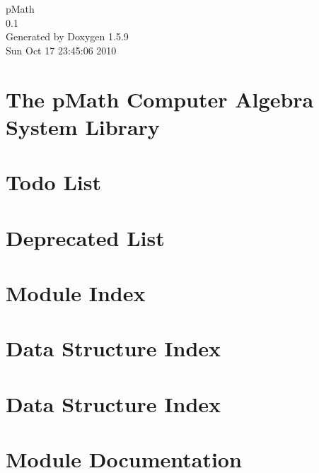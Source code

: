 \documentclass[a4paper]{article}
\begin{document}
\hypersetup{pageanchor=false}
\begin{titlepage}
\vspace*{7cm}
\begin{center}
{\Large pMath \\[1ex]\large 0.1 }\\
\vspace*{1cm}
{\large Generated by Doxygen 1.5.9}\\
\vspace*{0.5cm}
{\small Sun Oct 17 23:45:06 2010}\\
\end{center}
\end{titlepage}
\tableofcontents
{}
\hypersetup{pageanchor=true}
\section{The pMath Computer Algebra System Library}
\label{index}\hypertarget{index}{}
\section{Todo List}
\label{todo}
\hypertarget{todo}{}

\section{Deprecated List}
\label{deprecated}
\hypertarget{deprecated}{}

\section{Module Index}

\section{Data Structure Index}

\section{Data Structure Index}

\section{Module Documentation}




















\end{document}
